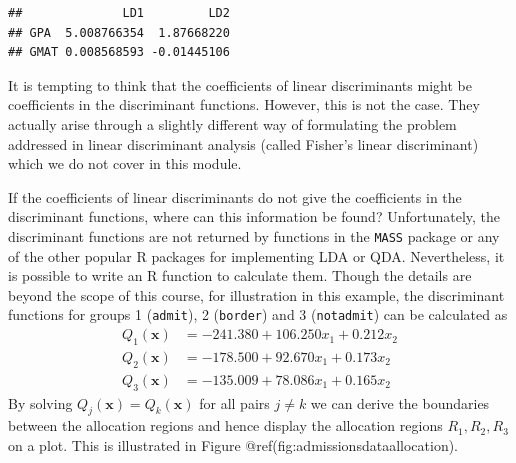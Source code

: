 \documentclass[
]{article}
\begin{document}
\begin{verbatim}
##              LD1         LD2
## GPA  5.008766354  1.87668220
## GMAT 0.008568593 -0.01445106
\end{verbatim}

It is tempting to think that the coefficients of linear discriminants
might be coefficients in the discriminant functions. However, this is
not the case. They actually arise through a slightly different way of
formulating the problem addressed in linear discriminant analysis
(called Fisher's linear discriminant) which we do not cover in this
module.

If the coefficients of linear discriminants do not give the coefficients
in the discriminant functions, where can this information be found?
Unfortunately, the discriminant functions are not returned by functions
in the \texttt{MASS} package or any of the other popular R packages for
implementing LDA or QDA. Nevertheless, it is possible to write an R
function to calculate them. Though the details are beyond the scope of
this course, for illustration in this example, the discriminant
functions for groups 1 (\texttt{admit}), 2 (\texttt{border}) and 3
(\texttt{notadmit}) can be calculated as \begin{align*}
Q_1(\boldsymbol{x}) &= -241.380 + 106.250 x_1 + 0.212 x_2\\
Q_2(\boldsymbol{x}) &= -178.500 + 92.670 x_1 + 0.173 x_2\\
Q_3(\boldsymbol{x}) &= -135.009 + 78.086 x_1 +  0.165 x_2
\end{align*} By solving \(Q_j(\boldsymbol{x}) = Q_k(\boldsymbol{x})\)
for all pairs \(j \ne k\) we can derive the boundaries between the
allocation regions and hence display the allocation regions
\(R_1, R_2, R_3\) on a plot. This is illustrated in Figure
@ref(fig:admissionsdataallocation).
\end{document}
